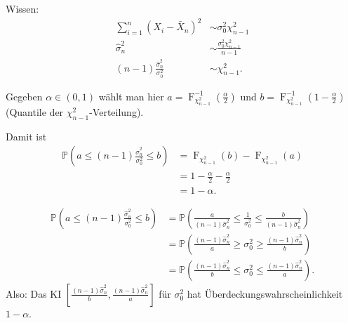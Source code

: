 \documentclass{tstextbook}
\DeclareMathOperator{\F}{F} %
\newcommand{\Prob}{\mathbb P}
\begin{document}
\begin{example}[Normalverteilung]
	Wissen: 
	\[
	\begin{aligned} 
		\sum_{i=1}^{n} (X_i-\bar{X}_n)^2 & \sim \sigma_0^2 \chi_{n-1}^2 \\
		\hat{\sigma}_n^2 & \sim \frac{\sigma_0^2 \chi_{n-1}^2}{n-1} \\
		(n-1) \frac{\hat{\sigma}_n^2}{\sigma_0^2} & \sim \chi_{n-1}^2 .
	\end{aligned}
	\]
	
	Gegeben $ \alpha \in (0,1) $  wählt man hier $ a = \F_{\chi_{n-1}^2}^{-1} \left(\frac{\alpha}{2}\right) $ und $ b = \F_{\chi_{n-1}^2}^{-1} \left(1-\frac{\alpha}{2}\right) $ (Quantile der $ \chi_{n-1}^2 $-Verteilung).
	
	Damit ist 
	\[
	\begin{aligned}
		\Prob\left(a\le (n-1) \frac{\hat{\sigma}_n^2}{\sigma_0^2} \le b \right) & = \F_{\chi_{n-1}^2}(b) - \F_{\chi_{n-1}^2}(a) \\
		& = 1 - \frac{\alpha}{2} - \frac{\alpha}{2} \\
		& = 1 - \alpha.
	\end{aligned}
	\]
	
	\[
	\begin{aligned}
		\Prob\left(a \le (n-1) \frac{\hat{\sigma}_n^2}{\sigma_0^2} \le b \right) & = \Prob\left(\frac{a}{(n-1)\hat{\sigma}_n^2} \le \frac{1}{\sigma_0^2} \le \frac{b}{(n-1)\hat{\sigma}_n^2} \right) \\
		& = \Prob\left(\frac{(n-1)\hat{\sigma}_n^2}{a} \ge \sigma_0^2 \ge \frac{(n-1)\hat{\sigma}_n^2}{b} \right)\\
		& = \Prob\left(\frac{(n-1)\hat{\sigma}_n^2}{b} \le \sigma_0^2 \le \frac{(n-1)\hat{\sigma}_n^2}{a} \right).
	\end{aligned}
	\]
	Also: Das KI $ \left[\frac{(n-1)\hat{\sigma}_n^2}{b}, \frac{(n-1)\hat{\sigma}_n^2}{a} \right] $ für $ \sigma_0^2 $ hat Überdeckungswahrscheinlichkeit $ 1-\alpha $.
\end{example}
\end{document}

